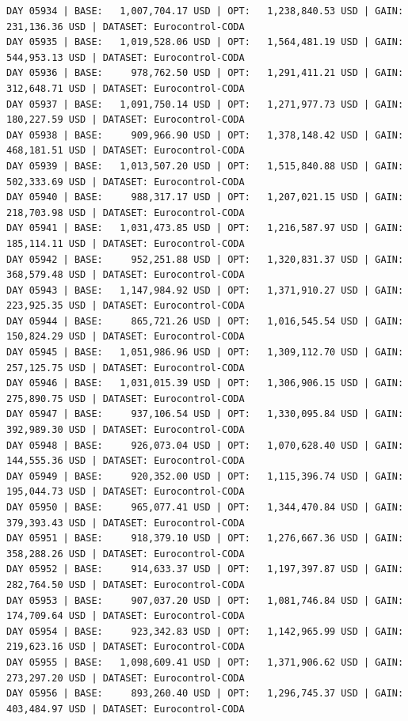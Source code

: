 \documentclass[11pt,a4paper]{article}
\begin{document}
\begin{verbatim}
DAY 05934 | BASE:   1,007,704.17 USD | OPT:   1,238,840.53 USD | GAIN: 231,136.36 USD | DATASET: Eurocontrol-CODA
DAY 05935 | BASE:   1,019,528.06 USD | OPT:   1,564,481.19 USD | GAIN: 544,953.13 USD | DATASET: Eurocontrol-CODA
DAY 05936 | BASE:     978,762.50 USD | OPT:   1,291,411.21 USD | GAIN: 312,648.71 USD | DATASET: Eurocontrol-CODA
DAY 05937 | BASE:   1,091,750.14 USD | OPT:   1,271,977.73 USD | GAIN: 180,227.59 USD | DATASET: Eurocontrol-CODA
DAY 05938 | BASE:     909,966.90 USD | OPT:   1,378,148.42 USD | GAIN: 468,181.51 USD | DATASET: Eurocontrol-CODA
DAY 05939 | BASE:   1,013,507.20 USD | OPT:   1,515,840.88 USD | GAIN: 502,333.69 USD | DATASET: Eurocontrol-CODA
DAY 05940 | BASE:     988,317.17 USD | OPT:   1,207,021.15 USD | GAIN: 218,703.98 USD | DATASET: Eurocontrol-CODA
DAY 05941 | BASE:   1,031,473.85 USD | OPT:   1,216,587.97 USD | GAIN: 185,114.11 USD | DATASET: Eurocontrol-CODA
DAY 05942 | BASE:     952,251.88 USD | OPT:   1,320,831.37 USD | GAIN: 368,579.48 USD | DATASET: Eurocontrol-CODA
DAY 05943 | BASE:   1,147,984.92 USD | OPT:   1,371,910.27 USD | GAIN: 223,925.35 USD | DATASET: Eurocontrol-CODA
DAY 05944 | BASE:     865,721.26 USD | OPT:   1,016,545.54 USD | GAIN: 150,824.29 USD | DATASET: Eurocontrol-CODA
DAY 05945 | BASE:   1,051,986.96 USD | OPT:   1,309,112.70 USD | GAIN: 257,125.75 USD | DATASET: Eurocontrol-CODA
DAY 05946 | BASE:   1,031,015.39 USD | OPT:   1,306,906.15 USD | GAIN: 275,890.75 USD | DATASET: Eurocontrol-CODA
DAY 05947 | BASE:     937,106.54 USD | OPT:   1,330,095.84 USD | GAIN: 392,989.30 USD | DATASET: Eurocontrol-CODA
DAY 05948 | BASE:     926,073.04 USD | OPT:   1,070,628.40 USD | GAIN: 144,555.36 USD | DATASET: Eurocontrol-CODA
DAY 05949 | BASE:     920,352.00 USD | OPT:   1,115,396.74 USD | GAIN: 195,044.73 USD | DATASET: Eurocontrol-CODA
DAY 05950 | BASE:     965,077.41 USD | OPT:   1,344,470.84 USD | GAIN: 379,393.43 USD | DATASET: Eurocontrol-CODA
DAY 05951 | BASE:     918,379.10 USD | OPT:   1,276,667.36 USD | GAIN: 358,288.26 USD | DATASET: Eurocontrol-CODA
DAY 05952 | BASE:     914,633.37 USD | OPT:   1,197,397.87 USD | GAIN: 282,764.50 USD | DATASET: Eurocontrol-CODA
DAY 05953 | BASE:     907,037.20 USD | OPT:   1,081,746.84 USD | GAIN: 174,709.64 USD | DATASET: Eurocontrol-CODA
DAY 05954 | BASE:     923,342.83 USD | OPT:   1,142,965.99 USD | GAIN: 219,623.16 USD | DATASET: Eurocontrol-CODA
DAY 05955 | BASE:   1,098,609.41 USD | OPT:   1,371,906.62 USD | GAIN: 273,297.20 USD | DATASET: Eurocontrol-CODA
DAY 05956 | BASE:     893,260.40 USD | OPT:   1,296,745.37 USD | GAIN: 403,484.97 USD | DATASET: Eurocontrol-CODA

\end{verbatim}
\end{document}
